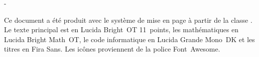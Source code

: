
\thispagestyle{empty}
\vspace*{\fill}

\begingroup
\calccentering{\unitlength}
\begin{adjustwidth*}{\unitlength}{-\unitlength}
  \begin{flushleft}
    \small %
    Ce document a été produit avec le système de mise en page
    {\XeLaTeX} à partir de la classe . Le texte
    principal est en Lucida Bright~OT 11~points, les mathématiques en
    Lucida Bright Math~OT, le code informatique en Lucida Grande
    Mono~DK et les titres en Fira Sans. Les icônes proviennent
    de la police Font~Awesome.
  \end{flushleft}
\end{adjustwidth*}
\endgroup
\vfill

